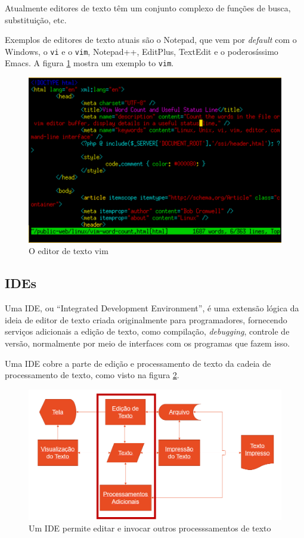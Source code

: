 Atualmente editores de texto têm um conjunto complexo de funções de busca, substituição, etc.

Exemplos de editores de texto atuais são o Notepad, que vem por \textit{default} com o Windows, o \texttt{vi} e o \texttt{vim}, Notepad++, EditPlus, TextEdit e o poderosíssimo Emacs. A figura \ref{fig:vim} mostra um exemplo to \texttt{vim}.


\begin{figure}[hbt]
    \centering
    \includegraphics[width=0.7\linewidth]{Images/vim}
    \caption{O editor de texto vim}
    \label{fig:vim}
\end{figure}


\subsection{IDEs}

Uma IDE, ou \enquote{Integrated Development Environment}, é uma extensão lógica da ideia de editor de texto criada originalmente para programadores, fornecendo serviços adicionais a edição de texto, como compilação, \textit{debugging}, controle de versão, normalmente por meio de interfaces com os programas que fazem isso.

Uma IDE cobre a parte de edição e processamento de texto da cadeia de processamento de texto, como visto na figura \ref{fig:ide:cadeia}.

\begin{figure}[hbt]
    \centering
    \includegraphics[width=0.7\linewidth]{Images/ide}
    \caption[Um IDE permite editar e invocar outros processsamentos de texto]{Um IDE permite editar e invocar outros processsamentos de texto}
    \label{fig:ide:cadeia}
\end{figure}



